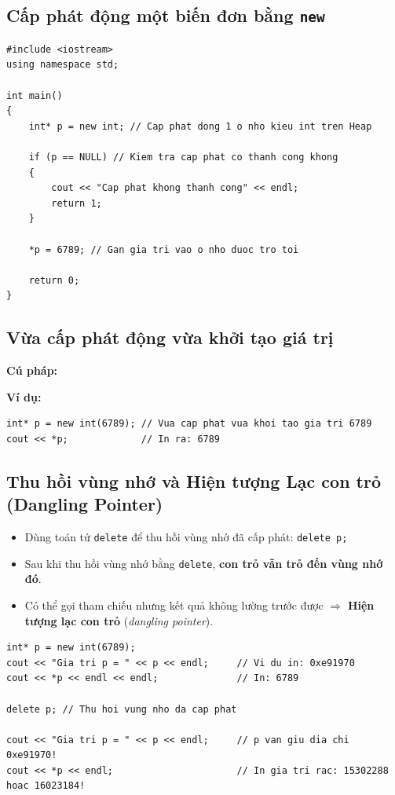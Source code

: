 \documentclass[12pt,a4paper]{article}
\begin{document}
\subsection{Cấp phát động một biến đơn bằng \texttt{new}}
\begin{lstlisting}
#include <iostream>
using namespace std;

int main()
{
    int* p = new int; // Cap phat dong 1 o nho kieu int tren Heap

    if (p == NULL) // Kiem tra cap phat co thanh cong khong
    {
        cout << "Cap phat khong thanh cong" << endl;
        return 1;
    }

    *p = 6789; // Gan gia tri vao o nho duoc tro toi

    return 0;
}
\end{lstlisting}

\subsection{Vừa cấp phát động vừa khởi tạo giá trị}
\textbf{Cú pháp:}
\begin{center}
\end{center}
\textbf{Ví dụ:}
\begin{lstlisting}
int* p = new int(6789); // Vua cap phat vua khoi tao gia tri 6789
cout << *p;             // In ra: 6789
\end{lstlisting}

\subsection{Thu hồi vùng nhớ và Hiện tượng Lạc con trỏ (Dangling Pointer)}
\begin{itemize}[itemsep=0.2em]
    \item Dùng toán tử \texttt{delete} để thu hồi vùng nhớ đã cấp phát: \texttt{delete p;}
    \item Sau khi thu hồi vùng nhớ bằng \texttt{delete}, \textbf{con trỏ vẫn trỏ đến vùng nhớ đó}.
    \item Có thể gọi tham chiếu nhưng kết quả không lường trước được $\Rightarrow$ \textbf{Hiện tượng lạc con trỏ} (\textit{dangling pointer}).
\end{itemize}

\begin{lstlisting}
int* p = new int(6789);
cout << "Gia tri p = " << p << endl;     // Vi du in: 0xe91970
cout << *p << endl << endl;              // In: 6789

delete p; // Thu hoi vung nho da cap phat

cout << "Gia tri p = " << p << endl;     // p van giu dia chi 0xe91970!
cout << *p << endl;                      // In gia tri rac: 15302288 hoac 16023184!
\end{lstlisting}
\end{document}

